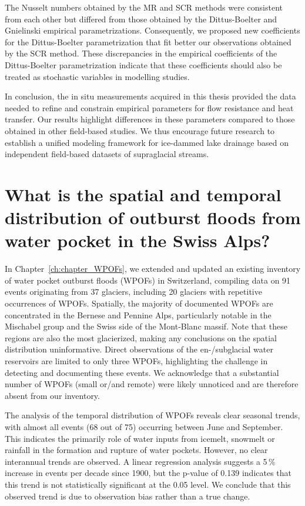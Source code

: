 The Nusselt numbers obtained by the MR and SCR methods were consistent from each other but differed from those obtained by the Dittus-Boelter and Gnielinski empirical parametrizations. Consequently, we proposed new coefficients for the Dittus-Boelter parametrization that fit better our observations obtained by the SCR method. These discrepancies in the empirical coefficients of the Dittus-Boelter parametrization indicate that these coefficients should also be treated as stochastic variables in modelling studies. 

In conclusion, the in situ measurements acquired in this thesis provided the data needed to refine and constrain empirical parameters for flow resistance and heat transfer. Our results highlight differences in these parameters compared to those obtained in other field-based studies. We thus encourage future research to establish a unified modeling framework for ice-dammed lake drainage based on independent field-based datasets of supraglacial streams.


\section{What is the spatial and temporal distribution of outburst floods from water pocket in the Swiss Alps?}

In Chapter~\ref{ch:chapter_WPOFs}, we extended and updated an existing inventory of water pocket outburst floods (WPOFs) in Switzerland, compiling data on 91 events originating from 37 glaciers, including 20 glaciers with repetitive occurrences of WPOFs. Spatially, the majority of documented WPOFs are concentrated in the Bernese and Pennine Alps, particularly notable in the Mischabel group and the Swiss side of the Mont-Blanc massif. Note that these regions are also the most glacierized, making any conclusions on the spatial distribution uninformative. Direct observations of the en-/subglacial water reservoirs are limited to only three WPOFs, highlighting the challenge in detecting and documenting these events. We acknowledge that a substantial number of WPOFs (small or/and remote) were likely unnoticed and are therefore absent from our inventory. 
%

The analysis of the temporal distribution of WPOFs reveals clear seasonal trends, with almost all events (68 out of 75) occurring between June and September. This indicates the primarily role of water inputs from icemelt, snowmelt or rainfall in the formation and rupture of water pockets. However, no clear interannual trends are observed. A linear regression analysis suggests a 5\,\% increase in events per decade since 1900, but the p-value of 0.139 indicates that this trend is not statistically significant at the 0.05 level. We conclude that this observed trend is due to observation bias rather than a true change.


